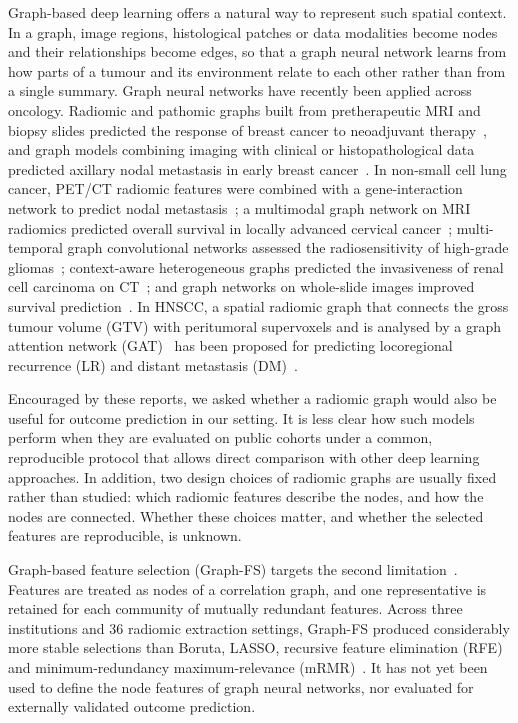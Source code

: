 \documentclass[11pt,a4paper]{article}
\begin{document}
Graph-based deep learning offers a natural way to represent such spatial context. In a graph, image regions, histological patches or data modalities become nodes and their relationships become edges, so that a graph neural network learns from how parts of a tumour and its environment relate to each other rather than from a single summary. Graph neural networks have recently been applied across oncology. Radiomic and pathomic graphs built from pretherapeutic MRI and biopsy slides predicted the response of breast cancer to neoadjuvant therapy~\cite{zhou2026radiopathomic}, and graph models combining imaging with clinical or histopathological data predicted axillary nodal metastasis in early breast cancer~\cite{xia2025breast,agyekum2025breast}. In non-small cell lung cancer, PET/CT radiomic features were combined with a gene-interaction network to predict nodal metastasis~\cite{ju2024nsclc}; a multimodal graph network on MRI radiomics predicted overall survival in locally advanced cervical cancer~\cite{li2026cervical}; multi-temporal graph convolutional networks assessed the radiosensitivity of high-grade gliomas~\cite{pan2025glioma}; context-aware heterogeneous graphs predicted the invasiveness of renal cell carcinoma on CT~\cite{jiang2025rcc}; and graph networks on whole-slide images improved survival prediction~\cite{wang2024dmgnn}. In HNSCC, a spatial radiomic graph that connects the gross tumour volume (GTV) with peritumoral supervoxels and is analysed by a graph attention network (GAT)~\cite{velickovic2018gat} has been proposed for predicting locoregional recurrence (LR) and distant metastasis (DM)~\cite{bae2025spatial}.

Encouraged by these reports, we asked whether a radiomic graph would also be useful for outcome prediction in our setting. It is less clear how such models perform when they are evaluated on public cohorts under a common, reproducible protocol that allows direct comparison with other deep learning approaches. In addition, two design choices of radiomic graphs are usually fixed rather than studied: which radiomic features describe the nodes, and how the nodes are connected. Whether these choices matter, and whether the selected features are reproducible, is unknown.

Graph-based feature selection (Graph-FS) targets the second limitation~\cite{moradmand2025graphfs}. Features are treated as nodes of a correlation graph, and one representative is retained for each community of mutually redundant features. Across three institutions and 36 radiomic extraction settings, Graph-FS produced considerably more stable selections than Boruta, LASSO, recursive feature elimination (RFE) and minimum-redundancy maximum-relevance (mRMR)~\cite{moradmand2025graphfs}. It has not yet been used to define the node features of graph neural networks, nor evaluated for externally validated outcome prediction.
\end{document}
